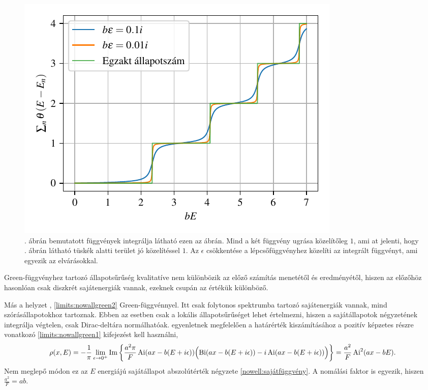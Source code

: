 \begin{figure}[H]
	\centering
	\includegraphics[scale=1]{./figs/numberofstatesfromgreen.pdf}
	\caption[Állapotok száma]{. ábrán bemutatott függvények integrálja látható ezen az ábrán. Mind a két függvény ugrása közelítőleg $1$, ami at jelenti, hogy . ábrán látható tüskék alatti terület jó közelítéssel $1$. Az $\epsilon$ csökkentése a lépcsőfüggvényhez közelíti az integrált függvényt, ami egyezik az elvárásokkal.}
\end{figure}
 Green-függvényhez tartozó állapotsűrűség kvalitatíve nem különbözik az előző számítás menetétől és eredményétől, hiszen az előzőhöz hasonlóan csak diszkrét sajátenergiák vannak, ezeknek csupán az értékük különböző.

Más a helyzet , \eqref{limits:nowallgreen2} Green-függvénnyel. Itt csak folytonos spektrumba tartozó sajátenergiák vannak, mind szórásállapotokhoz tartoznak. Ebben az esetben csak a lokális állapotsűrűséget lehet értelmezni, hiszen a sajátállapotok négyzetének integrálja végtelen, csak Dirac-deltára normálhatóak.  egyenletnek megfelelően a határérték kiszámításához a pozitív képzetes részre vonatkozó \eqref{limits:nowallgreen1} kifejezést kell használni,
\begin{dmath}
	\rho(x,E)=-\frac{1}{\pi}\lim_{\epsilon\to 0^+}\Im\left\lbrace\frac{a^2\pi}{F}\Ai(ax-b(E+i\epsilon))\Bigl(\Bi(ax-b(E+i\epsilon))-i\Ai(ax-b(E+i\epsilon))\Bigr)\right\rbrace=\frac{a^2}{F}\Ai^2(ax-bE).
\end{dmath}
Nem meglepő módon ez az $E$ energiájú sajátállapot abszolútérték négyzete \eqref{nowell:sajátfüggvény}. A nomálási faktor is egyezik, hiszen $\frac{a^2}{F}=ab$.




















